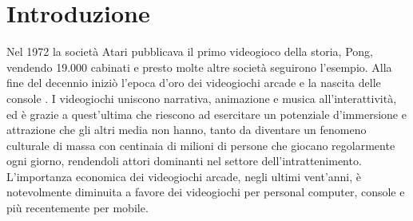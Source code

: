 %
%

\chapter*{Introduzione}





Nel 1972 la società Atari pubblicava il primo videogioco della storia, Pong, vendendo 19.000 cabinati e presto molte altre società seguirono l'esempio. Alla fine del decennio iniziò l'epoca d'oro dei videogiochi arcade e la nascita delle console \parencite{High_Score}. I videogiochi uniscono narrativa, animazione e musica all'interattività, ed è grazie a quest'ultima che riescono ad esercitare un potenziale d'immersione e attrazione che gli altri media non hanno, tanto da diventare un fenomeno culturale di massa con centinaia di milioni di persone che giocano regolarmente ogni giorno, rendendoli attori dominanti nel settore dell'intrattenimento. L'importanza economica dei videogiochi arcade, negli ultimi vent'anni, è notevolmente diminuita a favore dei videogiochi per personal computer, console e più recentemente per mobile.

